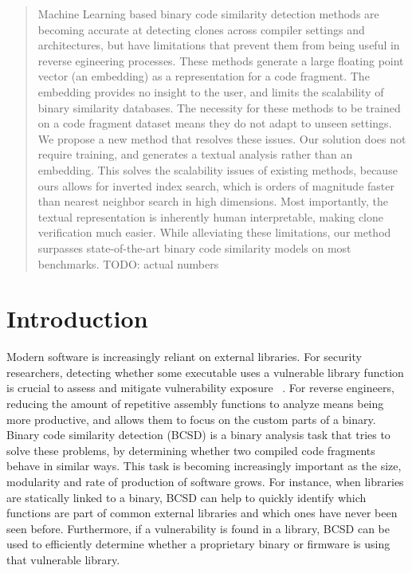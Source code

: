 \begin{abstract}

Machine Learning based binary code similarity detection methods are becoming accurate at detecting
clones across compiler settings and architectures, but have limitations that
prevent them from being useful in reverse egineering processes. These methods generate
a large floating point vector (an embedding) as a representation for a code fragment.
The embedding provides no insight to the user, and limits the scalability of binary similarity
databases. The necessity for these methods to be trained on a code fragment dataset
means they do not adapt to unseen settings. We propose a new method that resolves these issues.
Our solution does not require training, and generates a textual analysis rather than an embedding.
This solves the scalability issues of existing methods, because ours allows for inverted
index search, which is orders of magnitude faster than nearest neighbor search in high dimensions.
Most importantly, the textual representation is inherently human interpretable, making
clone verification much easier. While alleviating these limitations, our method surpasses
state-of-the-art binary code similarity models on most benchmarks. TODO: actual numbers

\end{abstract}


\section{Introduction}

Modern software is increasingly reliant on external libraries.
For security researchers, detecting whether some executable uses a vulnerable library function is crucial to assess
and mitigate vulnerability exposure ~\cite{BCSD, BCSDsurvey}. For reverse engineers, reducing the amount of repetitive assembly functions
to analyze means being more productive, and allows them to focus on the custom parts of a binary.  Binary code similarity
detection (BCSD) is a binary analysis task that tries to solve these problems, by determining whether two compiled
code fragments behave in similar ways. This task is becoming increasingly important as the size, modularity and rate of
production of software grows. For instance, when libraries are statically linked to a binary, BCSD can help to
quickly identify which functions are part of common external libraries and which ones have never been seen before.
Furthermore, if a vulnerability is found in a library, BCSD can be used to efficiently determine whether a proprietary
binary or firmware is using that vulnerable library.


